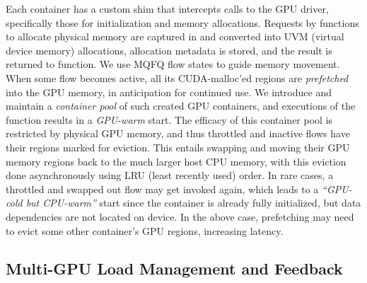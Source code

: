 Each container has a custom shim that intercepts calls to the GPU driver, specifically those for initialization and memory allocations.
Requests by functions to allocate physical memory are captured in and converted into UVM (virtual device memory) allocations, allocation metadata is stored, and the result is returned to function.
We use MQFQ flow states to guide memory movement.
When some flow becomes active, all its CUDA-malloc'ed regions are \emph{prefetched} into the GPU memory, in anticipation for continued use.
We introduce and maintain a \emph{container pool} of such created GPU containers, and executions of the function results in a \emph{GPU-warm} start.
The efficacy of this container pool is restricted by physical GPU memory, and thus throttled and inactive flows have their regions marked for eviction.
This entails swapping and moving their GPU memory regions back to the much larger host CPU memory, with this eviction done asynchronously using LRU (least recently used) order.
In rare cases, a throttled and swapped out flow may get invoked again, which leads to a \emph{``GPU-cold but CPU-warm''} start since the container is already fully initialized, but data dependencies are not located on device. 
In the above case, prefetching may need to evict some other container's GPU regions, increasing latency. 


\vspace*{\subsecspace}
\subsection{Multi-GPU Load Management and Feedback}
\label{sec:gpu-man}

